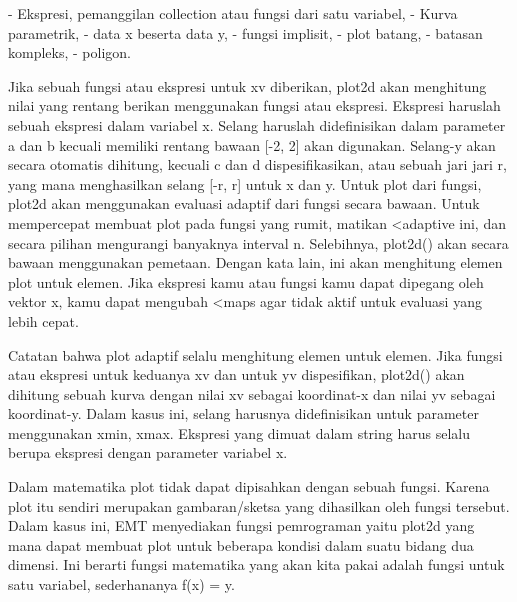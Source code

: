 \documentclass[a4paper,10pt]{article}
\begin{document}
\begin{eulernotebook}
\begin{eulercomment}
\begin{eulercomment}
\begin{eulercomment}
\begin{eulercomment}
\begin{eulercomment}
\end{eulercomment}
\begin{eulerttcomment}
 - Ekspresi, pemanggilan collection atau fungsi dari satu variabel,
 - Kurva parametrik,
 - data x beserta data y,
 - fungsi implisit,
 - plot batang,
 - batasan kompleks,
 - poligon.
\end{eulerttcomment}
\begin{eulercomment}

\end{eulercomment}
\begin{eulerttcomment}
  Jika sebuah fungsi atau ekspresi untuk xv diberikan, plot2d akan
  menghitung nilai yang rentang berikan menggunakan fungsi atau
  ekspresi. Ekspresi haruslah sebuah ekspresi dalam variabel x.
  Selang haruslah didefinisikan dalam parameter a dan b kecuali
  memiliki rentang bawaan [-2, 2] akan digunakan. Selang-y akan
  secara otomatis dihitung, kecuali c dan d dispesifikasikan, atau
  sebuah jari jari r, yang mana menghasilkan selang [-r, r] untuk
  x dan y. Untuk plot dari fungsi, plot2d akan menggunakan evaluasi
  adaptif dari fungsi secara bawaan. Untuk mempercepat membuat plot
  pada fungsi yang rumit, matikan <adaptive ini, dan secara pilihan
  mengurangi banyaknya interval n. Selebihnya, plot2d() akan secara
  bawaan menggunakan pemetaan. Dengan kata lain, ini akan menghitung
  elemen plot untuk elemen. Jika ekspresi kamu atau fungsi kamu
  dapat dipegang oleh vektor x, kamu dapat mengubah <maps agar
  tidak aktif untuk evaluasi yang lebih cepat.
\end{eulerttcomment}
\begin{eulercomment}

\end{eulercomment}
\begin{eulerttcomment}
  Catatan bahwa plot adaptif selalu menghitung elemen untuk elemen.
  Jika fungsi atau ekspresi untuk keduanya xv dan untuk yv
  dispesifikan, plot2d() akan dihitung sebuah kurva dengan nilai xv
  sebagai koordinat-x dan nilai yv sebagai koordinat-y. Dalam kasus
  ini, selang harusnya didefinisikan untuk parameter menggunakan
  xmin, xmax. Ekspresi yang dimuat dalam string harus selalu
  berupa ekspresi dengan parameter variabel x.
\end{eulerttcomment}
\begin{eulercomment}
Dalam matematika plot tidak dapat dipisahkan dengan sebuah fungsi.
Karena plot itu sendiri merupakan gambaran/sketsa yang dihasilkan oleh
fungsi tersebut. Dalam kasus ini, EMT menyediakan fungsi pemrograman
yaitu plot2d yang mana dapat membuat plot untuk beberapa kondisi dalam
suatu bidang dua dimensi. Ini berarti fungsi matematika yang akan kita
pakai adalah fungsi untuk satu variabel, sederhananya f(x) = y.


\end{eulercomment}
\end{eulercomment}
\end{eulercomment}
\end{eulercomment}
\end{eulercomment}
\end{eulernotebook}
\end{document}
